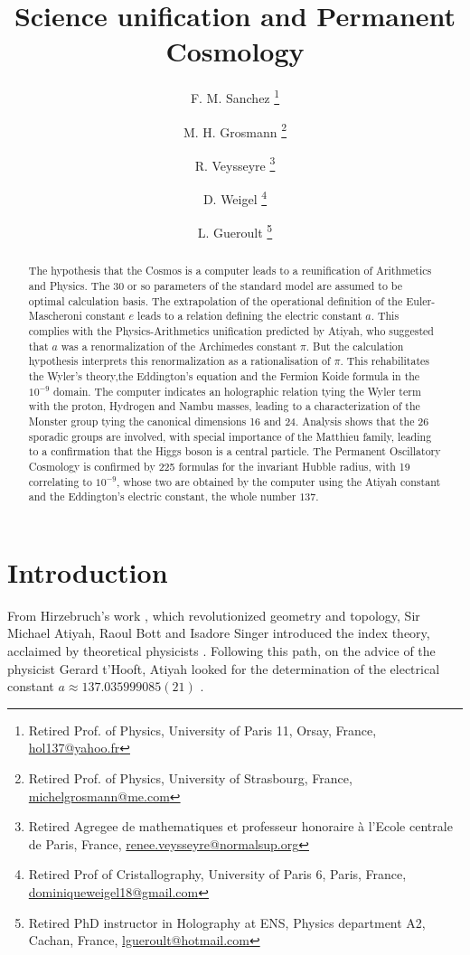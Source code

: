 \documentclass[a4paper,9pt]{article}
\title{Science unification and Permanent Cosmology}
\author{F. M. Sanchez \thanks{Retired Prof. of Physics, University of Paris 11, Orsay, France, \href{mailto:hol137@yahoo.fr}{hol137@yahoo.fr}} 
   \and M. H. Grosmann \thanks{Retired Prof. of Physics, University of Strasbourg, France, \href{mailto:michelgrosmann@me.com}{michelgrosmann@me.com}}
   \and R. Veysseyre \thanks{Retired Agregee de mathematiques et professeur honoraire \`a l'Ecole centrale de Paris, France, \href{mailto:renee.veysseyre@normalsup.org}{renee.veysseyre@normalsup.org}}
   \and D. Weigel  \thanks{Retired Prof of Cristallography, University of Paris 6, Paris, France, \href{mailto:dominiqueweigel18@gmail.com}{dominiqueweigel18@gmail.com}} 
   \and L. Gueroult \thanks{Retired PhD instructor in Holography at ENS, Physics department A2, Cachan, France, \href{mailto:lgueroult@hotmail.com}{lgueroult@hotmail.com}}
   }
\begin{document}
\setcounter{page}{1}

\maketitle

\begin{abstract}
The hypothesis that the Cosmos is a computer leads to a reunification of Arithmetics and Physics. The 30 or so parameters of the standard model are assumed to be optimal calculation basis. The extrapolation of the operational definition of the Euler-Mascheroni constant $e$ leads to a relation defining the electric constant $a$. This complies with the Physics-Arithmetics unification predicted by Atiyah, who suggested that $a$ was a renormalization of the Archimedes constant $\pi$. But the calculation hypothesis interprets this renormalization as a rationalisation of $\pi$. This rehabilitates the Wyler's theory,the Eddington's equation and the Fermion Koide formula in the $10^{-9}$ domain. The computer indicates an holographic relation tying the Wyler term with the proton, Hydrogen and Nambu masses, leading to a characterization of the Monster group tying the canonical dimensions 16 and 24. Analysis shows that the 26 sporadic groups are involved, with special importance of the Matthieu family, leading to a confirmation that the Higgs boson is a central particle. The Permanent Oscillatory Cosmology is confirmed by 225 formulas for the invariant Hubble radius, with 19 correlating to $10^{-9}$, whose two are obtained by the computer using the Atiyah constant and the Eddington's electric constant, the whole number $137 $. 
\end{abstract}





\label{sec:headings}

\section{Introduction}
  
    From Hirzebruch's work \cite{Hirzebruch}, which revolutionized geometry and topology, Sir Michael Atiyah, Raoul Bott \cite{Bott} and Isadore Singer \cite{Singer} introduced the index theory, acclaimed by theoretical physicists \cite{Alvarez}. Following this path, on the advice of the physicist Gerard t'Hooft, Atiyah looked for the determination of the electrical constant $a \approx 137.035999085(21)$ \cite{Atiyah}.
    
\end{document}
